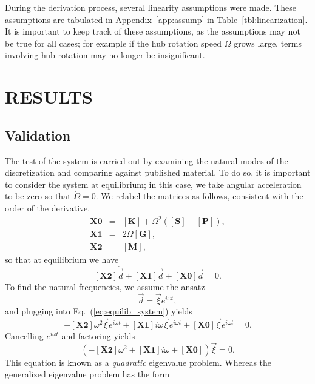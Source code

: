 During the derivation process, several linearity assumptions were made. These assumptions are tabulated in Appendix~\ref{app:assump} in Table~\ref{tbl:linearization}. It is important to keep track of these assumptions, as the assumptions may not be true for all cases; for example if the hub rotation speed $\Omega$ grows large, terms involving hub rotation may no longer be insignificant.

\chapter{RESULTS}
\label{ch:results}

\section{Validation}
\label{sec:validation}
The test of the system is carried out by examining the natural modes of the discretization and comparing against published material. To do so, it is important to consider the system at equilibrium; in this case, we take angular acceleration to be zero so that $\dot\Omega=0$. We relabel the matrices as follows, consistent with the order of the derivative.
\begin{eqnarray}
\mathbf{X0} &=& \mathbf{[K]}+\Omega^2(\mathbf{[S]}-\mathbf{[P]}),\label{eq:X0}\\
\mathbf{X1} &=& 2\Omega\mathbf{[G]},\label{eq:X1}\\
\mathbf{X2} &=& \mathbf{[M]},\label{eq:X2}
\end{eqnarray}
so that at equilibrium we have
\begin{equation}
\mathbf{[X2]}\ddot{\vec d}+\mathbf{[X1]}\dot{\vec d}+\mathbf{[X0]}\vec d=0.
\label{eq:equilib_system}
\end{equation}
To find the natural frequencies, we assume the ansatz
\begin{equation}
\vec d = \vec\xi e^{i\omega t},
\end{equation}
and plugging into Eq.~(\ref{eq:equilib_system}) yields 
\begin{equation}
-\mathbf{[X2]}\omega^2\vec\xi e^{i\omega t}+\mathbf{[X1]}i\omega\vec\xi e^{i\omega t}+\mathbf{[X0]}\vec\xi e^{i\omega t}=0.
\end{equation}
Cancelling $e^{i\omega t}$ and factoring yields 
\begin{equation}
\left(-\mathbf{[X2]}\omega^2+\mathbf{[X1]}i\omega+\mathbf{[X0]}\right)\vec\xi=0.
\end{equation}
This equation is known as a \emph{quadratic} eigenvalue problem. Whereas the generalized eigenvalue problem has the form
